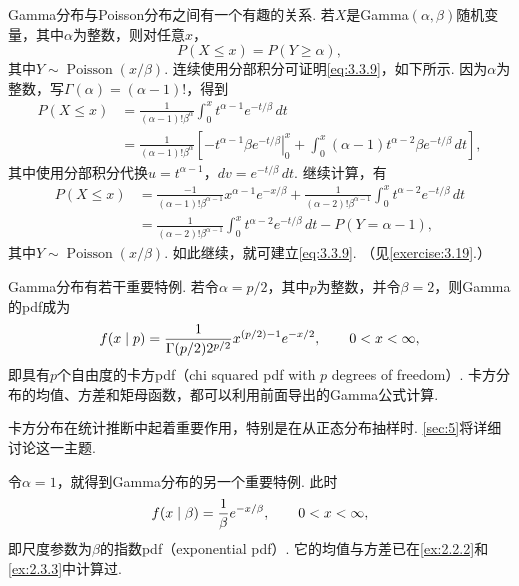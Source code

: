 \begin{example}[Gamma与Poisson的关系]\label{ex:3.3.1}
Gamma分布与Poisson分布之间有一个有趣的关系. 若$X$是Gamma$(\alpha,\beta)$随机变量，其中$\alpha$为整数，则对任意$x$，
\begin{equation}\label{eq:3.3.9}
P(X\le x)=P(Y\ge\alpha),
\end{equation}
其中$Y\sim\operatorname{Poisson}(x/\beta)$. 连续使用分部积分可证明\eqref{eq:3.3.9}，如下所示. 因为$\alpha$为整数，写$\Gamma(\alpha)=(\alpha-1)!$，得到
\begin{align*}
P(X\le x)&=\frac1{(\alpha-1)!\beta^\alpha}\int_0^x t^{\alpha-1}e^{-t/\beta}\,dt\\
&=\frac1{(\alpha-1)!\beta^\alpha}\left[\left.-t^{\alpha-1}\beta e^{-t/\beta}\right|_0^x+\int_0^x(\alpha-1)t^{\alpha-2}\beta e^{-t/\beta}\,dt\right],
\end{align*}
其中使用分部积分代换$u=t^{\alpha-1}$，$dv=e^{-t/\beta}\,dt$. 继续计算，有
\begin{align*}
P(X\le x)&=\frac{-1}{(\alpha-1)!\beta^{\alpha-1}}x^{\alpha-1}e^{-x/\beta}+\frac1{(\alpha-2)!\beta^{\alpha-1}}\int_0^x t^{\alpha-2}e^{-t/\beta}\,dt\\
&=\frac1{(\alpha-2)!\beta^{\alpha-1}}\int_0^x t^{\alpha-2}e^{-t/\beta}\,dt-P(Y=\alpha-1),
\end{align*}
其中$Y\sim\operatorname{Poisson}(x/\beta)$. 如此继续，就可建立\eqref{eq:3.3.9}. （见\autoref{exercise:3.19}.）
\end{example}

Gamma分布有若干重要特例. 若令$\alpha=p/2$，其中$p$为整数，并令$\beta=2$，则Gamma的pdf成为
\begin{equation}\label{eq:3.3.10}\index{SI0245@自由度}\index{SI0280@卡方}
f(x\mid p)=\frac1{\Gamma(p/2)2^{p/2}}x^{(p/2)-1}e^{-x/2},\qquad0<x<\infty,
\end{equation}
即具有$p$个自由度的卡方pdf（chi squared pdf with $p$ degrees of freedom）. 卡方分布的均值、方差和矩母函数，都可以利用前面导出的Gamma公式计算.

卡方分布在统计推断中起着重要作用，特别是在从正态分布抽样时. \autoref{sec:5}将详细讨论这一主题.

令$\alpha=1$，就得到Gamma分布的另一个重要特例. 此时
\begin{equation}\label{eq:3.3.11}\index{SI0289@指数}
f(x\mid\beta)=\frac1\beta e^{-x/\beta},\qquad0<x<\infty,
\end{equation}
即尺度参数为$\beta$的指数pdf（exponential pdf）. 它的均值与方差已在\autoref{ex:2.2.2}和\autoref{ex:2.3.3}中计算过.

